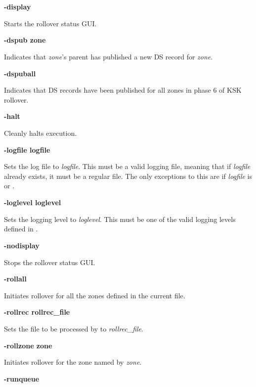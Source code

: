 \begin{description}

\item {\bf -display}\verb" "

Starts the rollover status GUI.

\item {\bf -dspub zone}\verb" "

Indicates that {\it zone}'s parent has published a new DS record for {\it zone}.

\item {\bf -dspuball}\verb" "

Indicates that DS records have been published for all zones in phase 6 of
KSK rollover.

\item {\bf -halt}\verb" "

Cleanly halts  execution.

\item {\bf -logfile logfile}\verb" "

Sets the  log file to {\it logfile}.  This must be a valid
logging file, meaning that if {\it logfile} already exists, it must be a
regular file.  The only exceptions to this are if {\it logfile} is
 or .

\item {\bf -loglevel loglevel}\verb" "

Sets the  logging level to {\it loglevel}.
This must be one of the valid logging levels defined in
.

\item {\bf -nodisplay}\verb" "

Stops the rollover status GUI.

\item {\bf -rollall}\verb" "

Initiates rollover for all the zones defined in the current 
file.

\item {\bf -rollrec rollrec\_file}\verb" "

Sets the  file to be processed by  to {\it
rollrec\_file}.

\item {\bf -rollzone zone}\verb" "

Initiates rollover for the zone named by {\it zone}.

\item {\bf -runqueue}\verb" "


\end{description}
